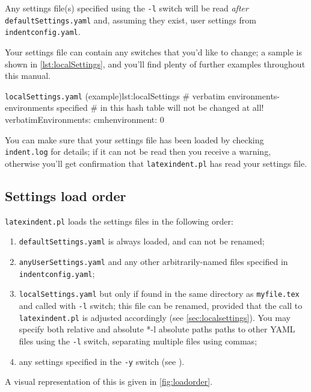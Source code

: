 	Any settings file(s) specified using the \texttt{-l} switch will be read \emph{after} \texttt{defaultSettings.yaml} and, assuming they exist,
	user settings from \texttt{indentconfig.yaml}.

	Your settings file can contain any switches that you'd
	like to change; a sample is shown in \cref{lst:localSettings}, and you'll find plenty of further examples throughout this manual.

	\begin{yaml}{\texttt{localSettings.yaml} (example)}{lst:localSettings}
#  verbatim environments- environments specified
#  in this hash table will not be changed at all!
verbatimEnvironments:
    cmhenvironment: 0
\end{yaml}

	You can make sure that your settings file has been loaded by checking \texttt{indent.log}
	for details; if it can not be read then you receive a warning, otherwise you'll get confirmation that
	\texttt{latexindent.pl} has read your settings file.

\subsection{Settings load order}\label{sec:loadorder}
	\texttt{latexindent.pl} loads the settings files in the following order:
	\begin{enumerate}
		\item \texttt{defaultSettings.yaml} is always loaded, and can not be renamed;
		\item \texttt{anyUserSettings.yaml} and any other arbitrarily-named files specified in \texttt{indentconfig.yaml};
		\item \texttt{localSettings.yaml} but only if found in the same directory as \texttt{myfile.tex} and called
		      with \texttt{-l} switch; this file can be renamed, provided that the call to \texttt{latexindent.pl} is adjusted
		      accordingly (see \cref{sec:localsettings}). You may specify both relative and absolute%
		      *{-l absolute paths} paths to other
		      YAML files using the \texttt{-l} switch, separating multiple files using commas;
		\item any settings%
		        specified in the \texttt{-y} switch (see ).
	\end{enumerate}
	A visual representation of this is given in \cref{fig:loadorder}.

